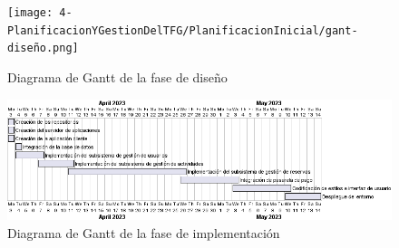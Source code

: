 \begin{figure}[H]
	\centering
	\texttt{[image: 4-PlanificacionYGestionDelTFG/PlanificacionInicial/gant-diseño.png]}
	\caption{Diagrama de Gantt de la fase de diseño}
\end{figure}

\begin{figure}[H]
	\centering
	\includegraphics[width=1\textwidth]{4-PlanificacionYGestionDelTFG/PlanificacionInicial/gant-implementacion.png}
	\caption{Diagrama de Gantt de la fase de implementación}
\end{figure}

